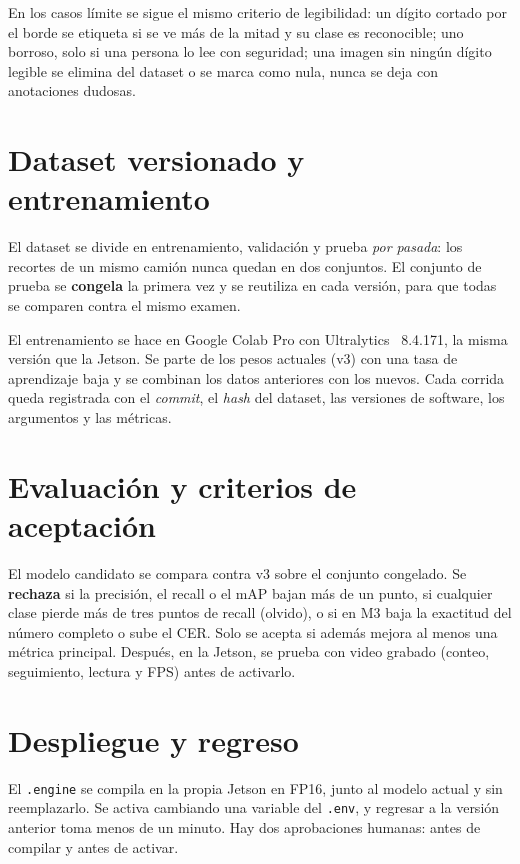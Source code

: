 En los casos límite se sigue el mismo criterio de legibilidad: un dígito
cortado por el borde se etiqueta si se ve más de la mitad y su clase es
reconocible; uno borroso, solo si una persona lo lee con seguridad; una
imagen sin ningún dígito legible se elimina del dataset o se marca como
nula, nunca se deja con anotaciones dudosas.

\section{Dataset versionado y entrenamiento}

El dataset se divide en entrenamiento, validación y prueba \emph{por
pasada}: los recortes de un mismo camión nunca quedan en dos conjuntos.
El conjunto de prueba se \textbf{congela} la primera vez y se reutiliza
en cada versión, para que todas se comparen contra el mismo examen.

El entrenamiento se hace en Google Colab Pro con
Ultralytics~\cite{ultralytics} 8.4.171, la misma versión que la Jetson.
Se parte de los pesos actuales (v3) con una tasa de aprendizaje baja y
se combinan los datos anteriores con los nuevos. Cada corrida queda
registrada con el \emph{commit}, el \emph{hash} del dataset, las
versiones de software, los argumentos y las métricas.

\section{Evaluación y criterios de aceptación}

El modelo candidato se compara contra v3 sobre el conjunto congelado.
Se \textbf{rechaza} si la precisión, el recall o el mAP bajan más de un
punto, si cualquier clase pierde más de tres puntos de recall (olvido),
o si en M3 baja la exactitud del número completo o sube el CER. Solo se
acepta si además mejora al menos una métrica principal. Después, en la
Jetson, se prueba con video grabado (conteo, seguimiento, lectura y
FPS) antes de activarlo.

\section{Despliegue y regreso}

El \texttt{.engine} se compila en la propia Jetson en FP16, junto al
modelo actual y sin reemplazarlo. Se activa cambiando una variable del
\texttt{.env}, y regresar a la versión anterior toma menos de un minuto.
Hay dos aprobaciones humanas: antes de compilar y antes de activar.

